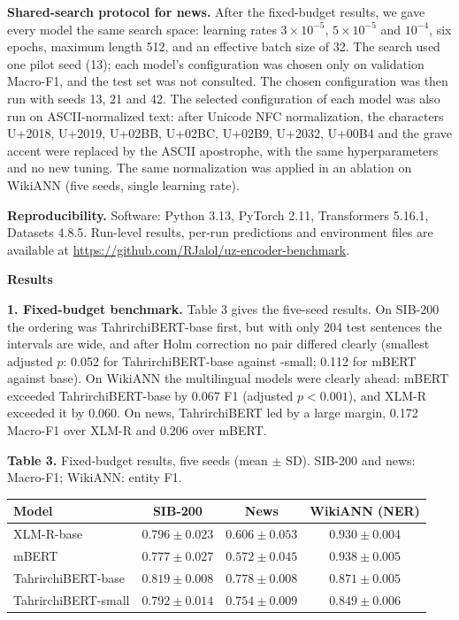 \documentclass[11pt]{book}
\begin{document}
\textbf{Shared-search protocol for news.} After the fixed-budget results, we gave every model the same search space: learning rates $3\times10^{-5}$, $5\times10^{-5}$ and $10^{-4}$, six epochs, maximum length 512, and an effective batch size of 32. The search used one pilot seed (13); each model's configuration was chosen only on validation Macro-F1, and the test set was not consulted. The chosen configuration was then run with seeds 13, 21 and 42. The selected configuration of each model was also run on ASCII-normalized text: after Unicode NFC normalization, the characters U+2018, U+2019, U+02BB, U+02BC, U+02B9, U+2032, U+00B4 and the grave accent were replaced by the ASCII apostrophe, with the same hyperparameters and no new tuning. The same normalization was applied in an ablation on WikiANN (five seeds, single learning rate).

\textbf{Reproducibility.} Software: Python 3.13, PyTorch 2.11, Transformers 5.16.1, Datasets 4.8.5. Run-level results, per-run predictions and environment files are available at \url{https://github.com/RJalol/uz-encoder-benchmark}.

\begin{center}
\textbf{Results}
\end{center}

\textbf{1. Fixed-budget benchmark.} Table 3 gives the five-seed results. On SIB-200 the ordering was TahrirchiBERT-base first, but with only 204 test sentences the intervals are wide, and after Holm correction no pair differed clearly (smallest adjusted $p$: 0.052 for TahrirchiBERT-base against -small; 0.112 for mBERT against base). On WikiANN the multilingual models were clearly ahead: mBERT exceeded TahrirchiBERT-base by 0.067 F1 (adjusted $p<0.001$), and XLM-R exceeded it by 0.060. On news, TahrirchiBERT led by a large margin, 0.172 Macro-F1 over XLM-R and 0.206 over mBERT.

\begin{center}
\textbf{Table 3.} Fixed-budget results, five seeds (mean $\pm$ SD). SIB-200 and news: Macro-F1; WikiANN: entity F1.\\[2pt]
\begin{tabular}{lccc}
\hline
Model & SIB-200 & News & WikiANN (NER) \\
\hline
XLM-R-base & $0.796\pm0.023$ & $0.606\pm0.053$ & $0.930\pm0.004$ \\
mBERT & $0.777\pm0.027$ & $0.572\pm0.045$ & $0.938\pm0.005$ \\
TahrirchiBERT-base & $0.819\pm0.008$ & $0.778\pm0.008$ & $0.871\pm0.005$ \\
TahrirchiBERT-small & $0.792\pm0.014$ & $0.754\pm0.009$ & $0.849\pm0.006$ \\
\hline
\end{tabular}
\end{center}
\end{document}
